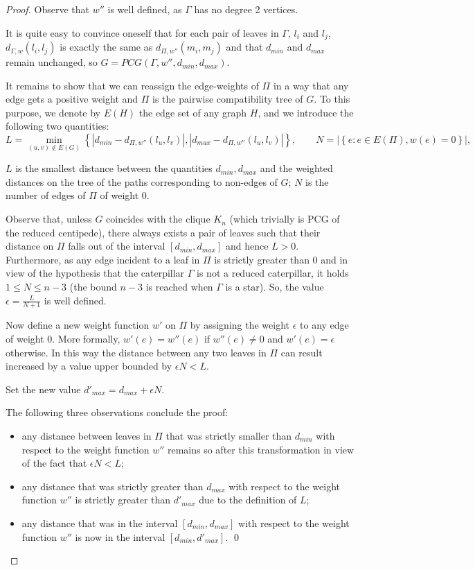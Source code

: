 \documentclass[review]{elsarticle}
\begin{document}
\begin{proof}
Observe that $w''$ is well defined, as $\Gamma$ has no degree 2 vertices.
 
It is quite easy to convince oneself that for each pair of leaves in $\Gamma$, $l_i$ and $l_j$, $d_{\Gamma, w}(l_i,l_j)$ is exactly the same as $d_{\Pi, w''}(m_i, m_j)$ and that $d_{min}$ and  $d_{max}$ remain unchanged, so $G=PCG(\Gamma, w'', d_{min}, d_{max})$. 

\medskip

It remains to show that we can reassign the edge-weights of $\Pi$ in a way that any edge gets a positive weight and  $\Pi$ is the pairwise compatibility tree of $G$. To this purpose, we denote by $E(H)$ the edge set of any graph $H$, and we introduce the following two quantities:
$$
L=\min_{(u,v)\not\in
E(G)}\left\{| d_{min}-d_{\Pi,w''}(l_{u},l_{v}) |,| d_{max}-d_{\Pi,w''}(l_{u},l_{v}) |\right\},
\qquad N=|\left\{e:  e \in E(\Pi), w(e)=0 \right\}|,
$$

$L$ is the smallest distance between the quantities $d_{min},d_{max}$ and the weighted distances on the tree of the
paths  corresponding to non-edges of $G$; 
$N$ is the number of edges of $\Pi$ of weight $0$. 

Observe that, unless $G$ coincides with the clique $K_n$ (which trivially is PCG of the reduced centipede), there always exists a pair of leaves such that their distance on $\Pi$ falls out of the interval $[d_{min}, d_{max}]$ and hence $L>0$. 
Furthermore, as any edge incident to a leaf in $\Pi$ is strictly greater than $0$ and in view of the hypothesis that the caterpillar $\Gamma$ is not a reduced caterpillar, it holds 
$1 \leq N \leq n-3$ (the bound $n-3$ is reached when $\Gamma$ is a star).
So, the value $\epsilon=\frac{L}{N+1}$ is well defined.

Now define a new weight function $w'$ on $\Pi$ by assigning the weight $\epsilon$ to any edge of weight $0$. More formally, $w'(e)=w''(e)$ if $w''(e) \neq 0$ and $w'(e)=\epsilon$ otherwise. 
In this way the distance between any two leaves in $\Pi$ can result increased by a value upper bounded by $\epsilon N < L$. 

Set the new value $d'_{max}=d_{max}+\epsilon N$.

The following three observations conclude the proof:
\begin{itemize}
\item
any distance between leaves in $\Pi$ that was strictly smaller than $d_{min}$ with respect to the weight function $w''$ remains so after this transformation in view of the fact that $\epsilon N < L$;
\item
any distance that was strictly greater than $d_{max}$ with respect to the weight function $w''$ is strictly greater than $d'_{max}$ due to the definition of $L$;
\item
any distance that was in the interval  $[d_{min}, d_{max}]$ with respect to the weight function $w''$ is now in the interval  $[d_{min}, d'_{max}]$. \qed
\end{itemize}
\end{proof}
\end{document}
